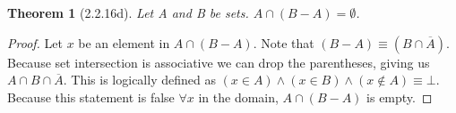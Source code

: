 \documentclass[a4paper, 12pt]{article}
\theoremstyle{plain}
\newtheorem*{theorem*}{Theorem}
\begin{document}
	
	\begin{theorem*}[2.2.16d]
		Let A and B be sets. $A \cap (B - A) = \emptyset$.
	\end{theorem*}
	
	\begin{proof}
		Let $x$ be an element in $A \cap (B - A)$. Note that 
		$(B - A) \equiv (B \cap \overline{A})$. Because set intersection is associative we can 
		drop the parentheses, giving us $A \cap B \cap \overline{A}$. This is logically defined 
		as $(x \in A) \land (x \in B) \land (x \notin A) \equiv \bot$. Because this statement is 
		false $\forall x$ in the domain, $A \cap (B - A)$ is empty.
	\end{proof}
\end{document}
